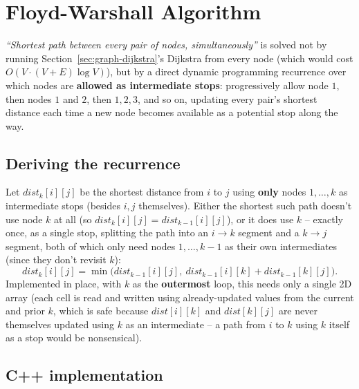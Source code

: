 \section{Floyd-Warshall Algorithm}
\label{sec:graph-floyd-warshall}


\begin{patternbox}
\emph{``Shortest path between every pair of nodes, simultaneously''}
is solved not by running Section~\ref{sec:graph-dijkstra}'s Dijkstra
from every node (which would cost $O(V \cdot (V+E)\log V)$), but by a
direct dynamic programming recurrence over which nodes are
\textbf{allowed as intermediate stops}: progressively allow node $1$,
then nodes $1$ and $2$, then $1,2,3$, and so on, updating every pair's
shortest distance each time a new node becomes available as a
potential stop along the way.
\end{patternbox}

\subsection*{Deriving the recurrence}

Let $\textit{dist}_k[i][j]$ be the shortest distance from $i$ to $j$
using \textbf{only} nodes $1,\ldots,k$ as intermediate stops (besides
$i,j$ themselves). Either the shortest such path doesn't use node $k$
at all (so $\textit{dist}_k[i][j] = \textit{dist}_{k-1}[i][j]$), or it
does use $k$ -- exactly once, as a single stop, splitting the path into
an $i\to k$ segment and a $k\to j$ segment, both of which only need
nodes $1,\ldots,k{-}1$ as their own intermediates (since they don't
revisit $k$):
\[
  \textit{dist}_k[i][j] = \min\big(\textit{dist}_{k-1}[i][j],\
  \textit{dist}_{k-1}[i][k] + \textit{dist}_{k-1}[k][j]\big).
\]
Implemented in place, with $k$ as the \textbf{outermost} loop, this
needs only a single 2D array (each cell is read and written using
already-updated values from the current and prior $k$, which is safe
because $\textit{dist}[i][k]$ and $\textit{dist}[k][j]$ are never
themselves updated using $k$ as an intermediate -- a path from $i$ to
$k$ using $k$ itself as a stop would be nonsensical).

\subsection*{C++ implementation}

